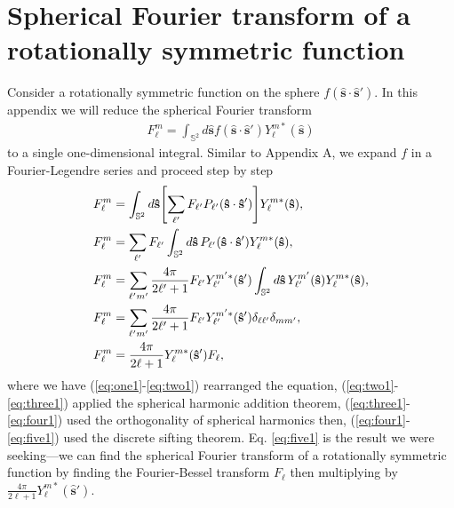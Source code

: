 \documentclass[11pt]{article}
\providecommand{\mh}[1]{\mathbf{\hat{#1}}}
\providecommand{\mbb}[1]{\mathbb{#1}}
\providecommand{\ints}[1]{\int_{\mbb{S}^{#1}}}
\let\originalleft\left
\let\originalright\right
\renewcommand{\left}{\mathopen{}\mathclose\bgroup\originalleft}
\renewcommand{\right}{\aftergroup\egroup\originalright}
\begin{document}
\section{Spherical Fourier transform of a rotationally symmetric function}
Consider a rotationally symmetric function on the sphere
$f(\mh{s}\cdot\mh{s}')$. In this appendix we will reduce the spherical Fourier
transform
\begin{align}
  F_\ell^m = \ints{2}d\mh{s}f(\mh{s}\cdot\mh{s}')Y_\ell^{m*}(\mh{s})
\end{align}
to a single one-dimensional integral. Similar to Appendix A, we expand $f$ in a Fourier-Legendre series and proceed step by step
\begin{align}
  F_\ell^m &= \ints{2}d\mh{s}\left[\sum_{\ell'}F_{\ell'} P_{\ell'}(\mh{s}\cdot\mh{s}')\right]Y_\ell^{m*}(\mh{s}),\label{eq:one1}\\
  F_\ell^m &= \sum_{\ell'}F_{\ell'}\ints{2}d\mh{s}\,P_{\ell'}(\mh{s}\cdot\mh{s}')Y_\ell^{m*}(\mh{s}),\label{eq:two1}\\
  F_\ell^m &= \sum_{\ell'm'}\frac{4\pi}{2\ell' + 1}F_{\ell'}Y_{\ell'}^{m'*}(\mh{s}')\ints{2}d\mh{s}\,Y_{\ell'}^{m'}(\mh{s})Y_\ell^{m*}(\mh{s}),\label{eq:three1}\\
  F_\ell^m &= \sum_{\ell'm'}\frac{4\pi}{2\ell' + 1}F_{\ell'}Y_{\ell'}^{m'*}(\mh{s}')\delta_{\ell\ell'}\delta_{mm'},\label{eq:four1}\\
  F_\ell^m &= \frac{4\pi}{2\ell + 1}Y_{\ell}^{m*}(\mh{s}')F_{\ell}\label{eq:five1},
\end{align}
where we have (\ref{eq:one1}-\ref{eq:two1}) rearranged the equation,
(\ref{eq:two1}-\ref{eq:three1}) applied the spherical harmonic addition theorem,
(\ref{eq:three1}-\ref{eq:four1}) used the orthogonality of spherical harmonics
then, (\ref{eq:four1}-\ref{eq:five1}) used the discrete sifting theorem. Eq.
\eqref{eq:five1} is the result we were seeking---we can find the spherical
Fourier transform of a rotationally symmetric function by finding the
Fourier-Bessel transform $F_\ell$ then multiplying by
$\frac{4\pi}{2\ell + 1}Y_{\ell}^{m*}(\mh{s}')$.
\end{document}

